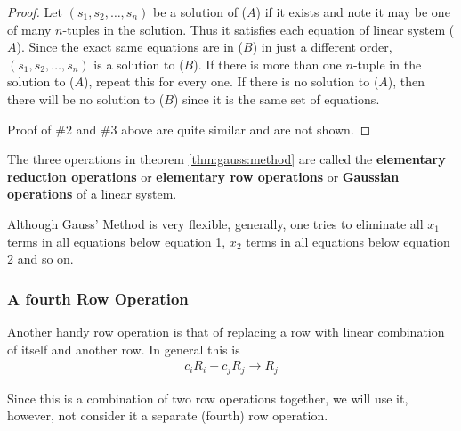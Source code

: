 \begin{proof}
Let $(s_1,s_2, \ldots, s_n)$ be a solution of ($A$) if it exists and note it may be one of many $n$-tuples in the solution.  Thus it satisfies each equation of linear system ($A$).  Since the exact same equations are in ($B$) in just a different order, $(s_1,s_2,\ldots,s_n)$ is a solution to ($B$).   If there is more than one $n$-tuple in the solution to ($A$), repeat this for every one.  If there is no solution to ($A$), then there will be no solution to ($B$) since it is the same set of equations.

Proof of \#2 and \#3 above are quite similar and are not shown.
\end{proof}


\begin{definition}
The three operations in theorem \ref{thm:gauss:method} are called the \textbf{elementary reduction operations} or \textbf{elementary row operations} or \textbf{Gaussian operations} of a linear system.
\end{definition}

\pagebreak

\begin{Boxed*}
Although Gauss' Method is very flexible, generally, one tries to eliminate all $x_1$ terms in all equations below equation 1, $x_2$ terms in all equations below equation 2 and so on.
\end{Boxed*}


\subsubsection{A fourth Row Operation}

Another handy row operation is that of replacing a row with linear combination of itself and another row.  In general this is
%
\begin{align*}
c_i R_i + c_j R_j \rightarrow R_j
\end{align*}

Since this is a combination of two row operations together, we will use it, however, not consider it a separate (fourth) row operation.



